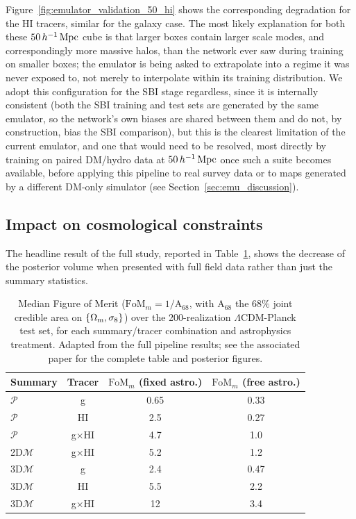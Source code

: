 Figure~\ref{fig:emulator_validation_50_hi} shows the corresponding
degradation for the HI tracers, similar for the galaxy case. The most likely explanation for both these $50\,h^{-1}\,\mathrm{Mpc}$ cube is that larger
boxes contain larger scale modes, and correspondingly more massive halos,
than the network ever saw during training on smaller boxes; the emulator is
being asked to extrapolate into a regime it was never exposed to, not
merely to interpolate within its training distribution. We adopt this
configuration for the SBI stage regardless, since it is internally
consistent (both the SBI training and test sets are generated by the same
emulator, so the network's own biases are shared between them and do not,
by construction, bias the SBI comparison), but this is the clearest
limitation of the current emulator, and one that would need to be resolved,
most directly by training on paired DM/hydro data at $50\,h^{-1}\,\mathrm{Mpc}$ once such a
suite becomes available, before applying this pipeline to real survey data
or to maps generated by a different DM-only simulator (see
Section~\ref{sec:emu_discussion}).


\subsection{Impact on cosmological constraints}
\label{sec:emu_downstream}

The headline result of the full study, reported in
Table~\ref{tab:emu_fom}, shows the decrease of the posterior volume when
presented with full field data rather than just the summary statistics.

\begin{table}[t]
    \centering
    \caption{Median Figure of Merit ($\mathrm{FoM}_m = 1/\mathrm{A}_{68}$,
    with $\mathrm{A}_{68}$ the $68\%$ joint credible area on
    $\{\Omega_\mathrm{m}, \sigma_8\}$) over the 200-realization $\Lambda$CDM-Planck test
    set, for each summary/tracer combination and astrophysics treatment.
    Adapted from the full pipeline results; see the associated paper for
    the complete table and posterior figures.}
    \label{tab:emu_fom}
    \begin{tabular}{l c c c}
        \toprule
        \textbf{Summary} & \textbf{Tracer} & \textbf{$\mathrm{FoM}_m$ (fixed astro.)} & \textbf{$\mathrm{FoM}_m$ (free astro.)} \\
        \midrule
        $\mathcal{P}$              & g            & 0.65 & 0.33 \\
        $\mathcal{P}$              & HI           & 2.5  & 0.27 \\
        $\mathcal{P}$              & g$\times$HI  & 4.7  & 1.0  \\
        2D$\mathcal{M}$            & g$\times$HI  & 5.2  & 1.2  \\
        3D$\mathcal{M}$            & g            & 2.4  & 0.47 \\
        3D$\mathcal{M}$            & HI           & 5.5  & 2.2  \\
        3D$\mathcal{M}$            & g$\times$HI  & 12   & 3.4  \\
        \bottomrule
    \end{tabular}
\end{table}

